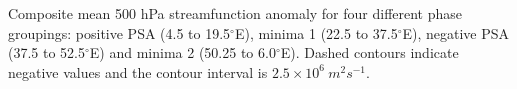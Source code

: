 \label{fig:sf_composites}
Composite mean 500 hPa streamfunction anomaly for four different phase groupings: positive PSA (4.5 to 19.5$^{\circ}$E), minima 1 (22.5 to 37.5$^{\circ}$E), negative PSA (37.5 to 52.5$^{\circ}$E) and minima 2 (50.25 to 6.0$^{\circ}$E). Dashed contours indicate negative values and the contour interval is $2.5 \times 10^6 \: m^2 s^{-1}$.
